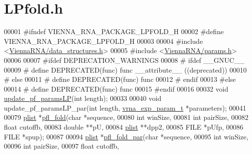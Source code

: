 \hypertarget{LPfold_8h_source}{}\section{L\+Pfold.\+h}
\label{LPfold_8h_source}

\begin{DoxyCode}
00001 \textcolor{preprocessor}{#ifndef VIENNA\_RNA\_PACKAGE\_LPFOLD\_H}
00002 \textcolor{preprocessor}{#define VIENNA\_RNA\_PACKAGE\_LPFOLD\_H}
00003 
00004 \textcolor{preprocessor}{#include <\hyperlink{data__structures_8h}{ViennaRNA/data\_structures.h}>}
00005 \textcolor{preprocessor}{#include <\hyperlink{params_8h}{ViennaRNA/params.h}>}
00006 
00007 \textcolor{preprocessor}{#ifdef DEPRECATION\_WARNINGS}
00008 \textcolor{preprocessor}{# ifdef \_\_GNUC\_\_}
00009 \textcolor{preprocessor}{#  define DEPRECATED(func) func \_\_attribute\_\_ ((deprecated))}
00010 \textcolor{preprocessor}{# else}
00011 \textcolor{preprocessor}{#  define DEPRECATED(func) func}
00012 \textcolor{preprocessor}{# endif}
00013 \textcolor{preprocessor}{#else}
00014 \textcolor{preprocessor}{# define DEPRECATED(func) func}
00015 \textcolor{preprocessor}{#endif}
00016 
00032 \textcolor{keywordtype}{void} \hyperlink{group__local__pf__fold_ga5a019014d37fe6105131dfc2fc447880}{update\_pf\_paramsLP}(\textcolor{keywordtype}{int} length);
00033 
00040 \textcolor{keywordtype}{void} update\_pf\_paramsLP\_par(\textcolor{keywordtype}{int} length, \hyperlink{group__energy__parameters_structvrna__exp__param__s}{vrna\_exp\_param\_t} *parameters);
00041 
00079 \hyperlink{group__data__structures_structvrna__plist__s}{plist} *\hyperlink{group__local__pf__fold_ga7dcf599d07258801ea55e7d14a56908d}{pfl\_fold}(\textcolor{keywordtype}{char} *sequence,
00080                 \textcolor{keywordtype}{int} winSize,
00081                 \textcolor{keywordtype}{int} pairSize,
00082                 \textcolor{keywordtype}{float} cutoffb,
00083                 \textcolor{keywordtype}{double} **pU,
00084                 \hyperlink{group__data__structures_structvrna__plist__s}{plist} **dpp2,
00085                 FILE *pUfp,
00086                 FILE *spup);
00087 
00094 \hyperlink{group__data__structures_structvrna__plist__s}{plist} *\hyperlink{group__local__pf__fold_ga14c2b82fdd5ab7a1951f1c2db4f5cf2c}{pfl\_fold\_par}(\textcolor{keywordtype}{char} *sequence,
00095                     \textcolor{keywordtype}{int} winSize,
00096                     \textcolor{keywordtype}{int} pairSize,
00097                     \textcolor{keywordtype}{float} cutoffb,

\end{DoxyCode}
